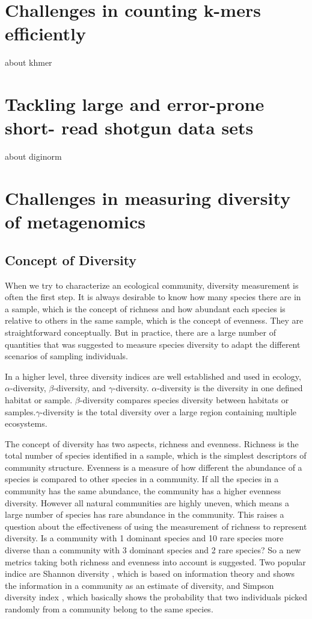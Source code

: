 \section{Challenges in counting k-mers efficiently}
about khmer

\section{Tackling large and error-prone short- read shotgun data sets}
about diginorm


\section{Challenges in measuring diversity of metagenomics}


\subsection{Concept of Diversity}
When we try to characterize an ecological community, diversity measurement is often the first step.
It is always desirable to know how many species there are in a sample, which is the concept of richness and how abundant each
 species is relative to others in the same sample, which is the concept of evenness. 
 They are straightforward conceptually. But in practice, there are a large number of quantities that was suggested
 to measure species diversity to adapt the different scenarios of sampling individuals. 

In a higher level, three diversity indices are well established and used in ecology, $\alpha$-diversity, $\beta$-diversity, and 
$\gamma$-diversity. $\alpha$-diversity is the diversity in one defined habitat or sample. $\beta$-diversity compares species 
diversity between habitats or samples.$\gamma$-diversity is the total diversity over a large region containing multiple ecosystems.

The concept of diversity has two aspects, richness and evenness. Richness is the total number of species
identified in a sample, which is the simplest descriptors of community structure. Evenness is a measure 
of how different the abundance of a species is compared to other species in a community. If all the species in a
 community has the same abundance, the community has a higher evenness diversity. However all natural communities 
 are highly uneven, which means a large number of species has rare abundance in the community. This raises
 a question about the effectiveness of using the measurement of richness to represent diversity. Is a community
 with 1 dominant species and 10 rare species more diverse than a community with 3 dominant species and 2 rare species?
  So a new metrics taking both richness and evenness into account is suggested. Two popular indice are Shannon diversity \cite{shannon2001mathematical},
  which is based on information theory and shows the information in a community as an estimate of diversity, and Simpson diversity index \cite{simpson1949measurement},
  which basically shows the probability that two individuals picked randomly from a community belong to the same species.

